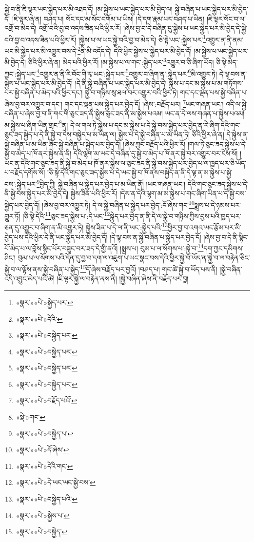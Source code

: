 སྐྱེ་བ་ནི་ཇི་ལྟར་ཡང་སྐྱེད་པར་མི་འཐད་དོ། །མ་སྐྱེས་པ་ཡང་སྐྱེད་པར་མི་བྱེད་ལ། སྐྱེ་བཞིན་པ་ཡང་སྐྱེད་པར་མི་བྱེད་དོ། །ཇི་ལྟར་ཞེ་ན། བཤད་པ། སོང་དང་མ་སོང་བགོམ་པ་ཡིས། །དེ་དག་རྣམ་པར་བཤད་པ་ཡིན། །ཇི་ལྟར་སོང་བ་ལ་འགྲོ་བ་མེད་དེ། འགྲོ་བའི་བྱ་བ་འདས་ཟིན་པའི་ཕྱིར་རོ། །ཞེས་བྱ་བ་དེ་བཞིན་དུ་སྐྱེས་པ་ཡང་སྐྱེད་པར་མི་བྱེད་དེ་སྐྱེ་བའི་བྱ་བ་འདས་ཟིན་པའི་ཕྱིར་རོ། །སྐྱེས་པ་ལ་ཡང་སྐྱེ་བའི་བྱ་བ་མེད་དེ། ཅི་སྟེ་ཡང་:སྐྱེས་པར་\footnote{«སྣར་»«པེ་»སྐྱེད་པར་}འགྱུར་ན་ནི་ནམ་ཡང་མི་སྐྱེད་པར་མི་འགྱུར་བས་དེ་\footnote{«སྣར་»«པེ་»དེའི་}ནི་མི་འདོད་དེ། དེའི་ཕྱིར་སྐྱེས་པ་སྐྱེད་པར་མི་བྱེད་དོ། །མ་སྐྱེས་པ་ཡང་སྐྱེད་པར་མི་བྱེད་དེ། ཅིའི་ཕྱིར་ཞེ་ན། མེད་པའི་ཕྱིར་རོ། །མ་སྐྱེས་པ་ལ་གང་:སྐྱེད་པར་\footnote{«སྣར་»«པེ་»བསྐྱེད་པར་}འགྱུར་བ་ཅི་ཞིག་ཡོད། ཅི་སྟེ་མེད་ཀྱང་:སྐྱེད་པར་\footnote{«སྣར་»«པེ་»བསྐྱེད་པར་}འགྱུར་ན་ནི་རི་བོང་གི་རྭ་ཡང་:སྐྱེད་པར་\footnote{«སྣར་»«པེ་»བསྐྱེད་པར་}འགྱུར་བ་ཞིག་ན་:སྐྱེད་པར་\footnote{«སྣར་»«པེ་»བསྐྱེད་པར་}མི་འགྱུར་ཏེ། དེ་ལྟ་བས་ན་སྐྱེས་པ་ཡང་སྐྱེད་པར་མི་བྱེད་དོ། །དེ་ནི་སྐྱེ་བཞིན་པ་ཡང་སྐྱེད་པར་མི་བྱེད་དེ། སྐྱེས་པ་དང་མ་སྐྱེས་པ་མ་གཏོགས་པར་སྐྱེ་བཞིན་པ་མེད་པའི་ཕྱིར་དང་། སྐྱེ་བ་གཉིས་སུ་ཐལ་བར་འགྱུར་བའི་ཕྱིར་ཏེ། གང་དང་ལྡན་པས་སྐྱེ་བཞིན་པ་ཞེས་བྱ་བར་འགྱུར་བ་དང་། གང་དང་ལྡན་པས་སྐྱེད་པར་བྱེད་དོ། །ཞེས་:བརྗོད་པར། \footnote{«སྣར་»«པེ་»བརྗོད་པའོ་}ཡང་གཞན་ཡང་། འདི་ལ་སྐྱེ་བཞིན་པ་ཞེས་བྱ་བ་ནི་གང་གི་ཅུང་ཟད་ནི་སྐྱེས་ཅུང་ཟད་ནི་མ་སྐྱེས་པའམ། ཡང་ན་དེ་ལས་གཞན་པ་སྐྱེས་པའམ། མ་སྐྱེས་པ་ཞིག་ཡིན་གྲང་\footnote{«སྡེ་»གང་}ན། དེ་ལ་གལ་ཏེ་སྐྱེས་པ་དང་མ་སྐྱེས་པ་དེ་སྐྱེ་བས་སྐྱེད་པར་བྱེད་ན་རེ་ཞིག་དེའི་གང་ཅུང་ཟད་སྐྱེད་པ་དེ་ནི་སྐྱེ་བ་དེས་བསྐྱེད་པ་མ་ཡིན་ལ། སྐྱེས་པ་དེ་སྐྱེ་བཞིན་པ་མ་ཡིན་ཏེ། ཅིའི་ཕྱིར་ཞེ་ན། དེ་སྐྱེས་ན་སྐྱེ་བཞིན་པ་མ་ཡིན་ཞིང་སྐྱེ་བཞིན་པ་སྐྱེད་པར་བྱེད་དོ། །ཞེས་ཀྱང་བརྗོད་པའི་ཕྱིར་རོ། །གལ་ཏེ་ཅུང་ཟད་སྐྱེས་པ་དེ་སྐྱེ་བ་མེད་པ་ཁོ་ནར་སྐྱེས་ན་ནི། དེའི་ལྷག་མ་ཡང་དེ་བཞིན་དུ་སྐྱེ་བ་མེད་པ་ཁོ་ནར་སྐྱེ་བར་འགྱུར་བར་ངེས་སོ། །ཡང་ན་དེའི་གང་ཅུང་ཟད་ནི་སྐྱེ་བ་མེད་པ་ཁོ་ནར་སྐྱེས་ལ་ཅུང་ཟད་ནི་སྐྱེ་བས་སྐྱེད་པར་བྱེད་པ་ལ་ཁྱད་པར་ཅི་ཡོད་པ་བརྗོད་དགོས་སོ། །ཅི་སྟེ་དེའི་གང་ཅུང་ཟད་སྐྱེས་པ་དེ་ཡང་སྐྱེ་བ་ཁོ་ནས་བསྐྱེད་ན་ནི་དེ་ལྟ་ན་མ་སྐྱེས་པ་སྐྱེ་བས་:སྐྱེད་པར་\footnote{«སྣར་»«པེ་»བསྐྱེད་པ་}བྱེད་ཀྱི། སྐྱེ་བཞིན་པ་སྐྱེད་པར་བྱེད་པ་མ་ཡིན་ནོ། །ཡང་གཞན་ཡང་། དེའི་གང་ཅུང་ཟད་སྐྱེས་པ་དེ་ནི་སྐྱེ་བས་སྐྱེད་པར་མི་བྱེད་དེ། སྐྱེས་ཟིན་པའི་ཕྱིར་རོ། །དེས་ན་དེའི་ལྷག་མ་མ་སྐྱེས་པ་གང་ཞིག་ཡིན་པ་དེ་སྐྱེ་བས་སྐྱེད་པར་བྱེད་དོ། །ཞེས་བྱ་བར་འགྱུར་ཏེ། དེ་ལ་སྐྱེ་བཞིན་པ་སྐྱེད་པར་བྱེད་:དོ་ཞེས་གང་\footnote{«སྣར་»«པེ་»དོ་ཞེས་}སྨྲས་པ་དེ་ཉམས་པར་གྱུར་ཏོ། །ཅི་སྟེ་དེའི་\footnote{«སྣར་»«པེ་»དེའི་གང་}ཅུང་ཟད་སྐྱེས་པ་:དེ་ཡང་\footnote{«སྣར་»«པེ་»དེ་ཡང་ཡང་སྐྱེ་བས་}སྐྱེད་པར་བྱེད་ན་ནི་དེ་ལ་སྐྱེ་བ་གཉིས་ཀྱིས་བྱས་པའི་ཁྱད་པར་ཅན་དུ་འགྱུར་བ་ཞིག་ན་མི་འགྱུར་ཏེ། སྐྱེས་ཟིན་པ་དེ་ལ་ནི་ཡང་:སྐྱེད་པའི་\footnote{«སྣར་»«པེ་»བསྐྱེད་པའི་}ཕྱིར་བྱ་བ་འགའ་ཡང་རྩོམ་པར་མི་བྱེད་པས་དེའི་ཕྱིར་དེ་ནི་ཡང་སྐྱེད་པར་མི་བྱེད་དོ། །དེ་ལྟ་བས་ན་སྐྱེ་བཞིན་པ་སྐྱེད་པར་བྱེད་དོ། །ཞེས་བྱ་བ་དེ་ནི་སྙིང་པོ་མེད་པ་ལ་བློས་སྙིང་པོར་བཟུང་བར་ཟད་དེ་གྱི་ནའོ། །སྨྲས་པ། བུམ་པ་ལ་སོགས་པ་:སྐྱེ་བ་\footnote{«སྣར་»«པེ་»སྐྱེས་པ་}དག་ཀྱང་དམིགས་ཤིང་། བུམ་པ་ལ་སོགས་པའི་དོན་དུ་བྱ་བ་དག་ལ་འཇུག་པ་ཡང་སྣང་བས་དེའི་ཕྱིར་སྐྱེ་བ་ཡོད་ན་སྐྱེ་བ་ལ་བརྟེན་ཅིང་སྐྱེ་བ་ལ་ལྟོས་ནས་སྐྱེ་བཞིན་པ་སྐྱེད་\footnote{«སྣར་»«པེ་»བསྐྱེད་}དོ་ཞེས་བརྗོད་པར་བྱའོ། །བཤད་པ། གང་ཚེ་སྐྱེ་བ་ཡོད་པས་ནི། །སྐྱེ་བཞིན་འདི་འབྱུང་མེད་པའི་ཚེ། །ཇི་ལྟར་སྐྱེ་ལ་བརྟེན་ནས་ནི། །སྐྱེ་བཞིན་ཞེས་ནི་བརྗོད་པར་བྱ། 